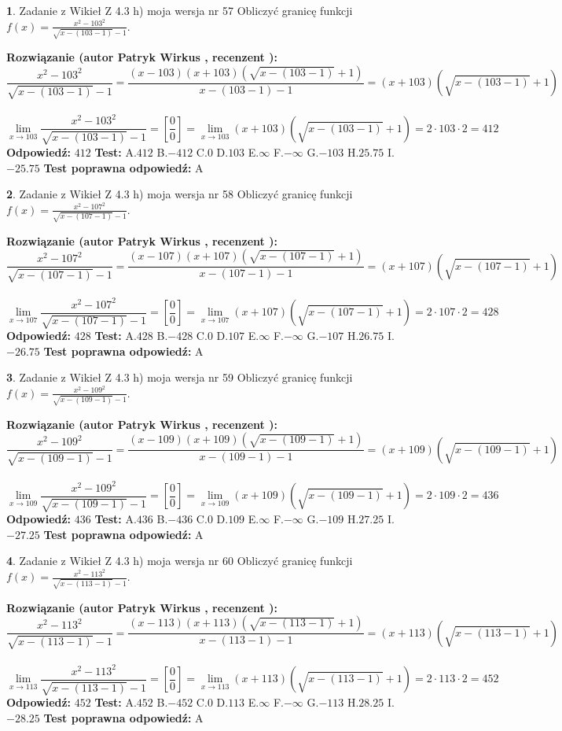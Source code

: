 \documentclass[12pt, a4paper]{article}
\theoremstyle{definition} %
\newtheorem{zad}{}
\newcommand{\zadStart}[1]{\begin{zad}#1\newline}
\newcommand{\zadStop}{\end{zad}}
\newcommand{\rozwStart}[2]{\noindent \textbf{Rozwiązanie (autor #1 , recenzent #2): }\newline}
\newcommand{\rozwStop}{\newline}
\newcommand{\odpStart}{\noindent \textbf{Odpowiedź:}\newline}
\newcommand{\odpStop}{\newline}
\newcommand{\testStart}{\noindent \textbf{Test:}\newline}
\newcommand{\testStop}{\newline}
\newcommand{\kluczStart}{\noindent \textbf{Test poprawna odpowiedź:}\newline}
\newcommand{\kluczStop}{\newline}
\begin{document}
\zadStart{Zadanie z Wikieł Z 4.3 h) moja wersja nr 57}
Obliczyć granicę funkcji $f(x)=\frac{x^{2} - 103^{2}}{\sqrt{x-(103-1)}-1}$.
\zadStop
\rozwStart{Patryk Wirkus}{}
$$\frac{x^{2} - 103^{2}}{\sqrt{x-(103-1)}-1}=\frac{(x-103)(x+103)(\sqrt{x-(103-1)}+1)}{x-(103-1)-1}=(x+103)(\sqrt{x-(103-1)}+1)$$
\\
$$\lim\limits_{x\to 103}\frac{x^{2} - 103^{2}}{\sqrt{x-(103-1)}-1}=[\frac{0}{0}]=
\lim\limits_{x\to 103}(x+103)(\sqrt{x-(103-1)}+1) = 2\cdot103 \cdot 2 = 412$$
\rozwStop
\odpStart
$412$
\odpStop
\testStart
A.$412$
B.$-412$
C.$0$
D.$103$
E.$\infty$
F.$-\infty$
G.$-103$
H.$25.75$
I.$-25.75$
\testStop
\kluczStart
A
\kluczStop



\zadStart{Zadanie z Wikieł Z 4.3 h) moja wersja nr 58}
Obliczyć granicę funkcji $f(x)=\frac{x^{2} - 107^{2}}{\sqrt{x-(107-1)}-1}$.
\zadStop
\rozwStart{Patryk Wirkus}{}
$$\frac{x^{2} - 107^{2}}{\sqrt{x-(107-1)}-1}=\frac{(x-107)(x+107)(\sqrt{x-(107-1)}+1)}{x-(107-1)-1}=(x+107)(\sqrt{x-(107-1)}+1)$$
\\
$$\lim\limits_{x\to 107}\frac{x^{2} - 107^{2}}{\sqrt{x-(107-1)}-1}=[\frac{0}{0}]=
\lim\limits_{x\to 107}(x+107)(\sqrt{x-(107-1)}+1) = 2\cdot107 \cdot 2 = 428$$
\rozwStop
\odpStart
$428$
\odpStop
\testStart
A.$428$
B.$-428$
C.$0$
D.$107$
E.$\infty$
F.$-\infty$
G.$-107$
H.$26.75$
I.$-26.75$
\testStop
\kluczStart
A
\kluczStop



\zadStart{Zadanie z Wikieł Z 4.3 h) moja wersja nr 59}
Obliczyć granicę funkcji $f(x)=\frac{x^{2} - 109^{2}}{\sqrt{x-(109-1)}-1}$.
\zadStop
\rozwStart{Patryk Wirkus}{}
$$\frac{x^{2} - 109^{2}}{\sqrt{x-(109-1)}-1}=\frac{(x-109)(x+109)(\sqrt{x-(109-1)}+1)}{x-(109-1)-1}=(x+109)(\sqrt{x-(109-1)}+1)$$
\\
$$\lim\limits_{x\to 109}\frac{x^{2} - 109^{2}}{\sqrt{x-(109-1)}-1}=[\frac{0}{0}]=
\lim\limits_{x\to 109}(x+109)(\sqrt{x-(109-1)}+1) = 2\cdot109 \cdot 2 = 436$$
\rozwStop
\odpStart
$436$
\odpStop
\testStart
A.$436$
B.$-436$
C.$0$
D.$109$
E.$\infty$
F.$-\infty$
G.$-109$
H.$27.25$
I.$-27.25$
\testStop
\kluczStart
A
\kluczStop



\zadStart{Zadanie z Wikieł Z 4.3 h) moja wersja nr 60}
Obliczyć granicę funkcji $f(x)=\frac{x^{2} - 113^{2}}{\sqrt{x-(113-1)}-1}$.
\zadStop
\rozwStart{Patryk Wirkus}{}
$$\frac{x^{2} - 113^{2}}{\sqrt{x-(113-1)}-1}=\frac{(x-113)(x+113)(\sqrt{x-(113-1)}+1)}{x-(113-1)-1}=(x+113)(\sqrt{x-(113-1)}+1)$$
\\
$$\lim\limits_{x\to 113}\frac{x^{2} - 113^{2}}{\sqrt{x-(113-1)}-1}=[\frac{0}{0}]=
\lim\limits_{x\to 113}(x+113)(\sqrt{x-(113-1)}+1) = 2\cdot113 \cdot 2 = 452$$
\rozwStop
\odpStart
$452$
\odpStop
\testStart
A.$452$
B.$-452$
C.$0$
D.$113$
E.$\infty$
F.$-\infty$
G.$-113$
H.$28.25$
I.$-28.25$
\testStop
\kluczStart
A
\kluczStop
\end{document}
